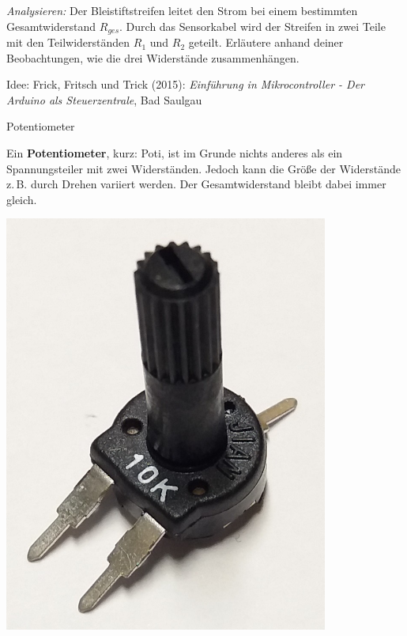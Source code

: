 \begin{aufgabe}
	\medskip
	\emph{Analysieren:}	Der Bleistiftstreifen leitet den Strom bei einem bestimmten Gesamtwiderstand $R_{ges}$. Durch das Sensorkabel wird der Streifen in zwei Teile mit den Teilwiderständen $R_1$ und $R_2$ geteilt. Erläutere anhand deiner Beobachtungen, wie die drei Widerstände zusammenhängen.
	
	{\scriptsize Idee: Frick, Fritsch und Trick (2015): \emph{Einführung in Mikrocontroller - Der Arduino als Steuerzentrale}, Bad Saulgau}
\end{aufgabe}
\vfill

\begin{zsfg}{Potentiometer}
	\begin{minipage}{0.7\textwidth}
		Ein \textbf{Potentiometer}, kurz: Poti, ist im Grunde nichts anderes als ein Spannungsteiler mit zwei Widerständen. Jedoch kann die Größe der Widerstände z.\,B. durch Drehen variiert werden. Der Gesamtwiderstand bleibt dabei immer gleich.
	\end{minipage}
	\hfill
	\begin{minipage}{0.28\textwidth}
		\begin{minipage}{0.48\textwidth}
			\centering
			\includegraphics[angle=-90,width=0.8\textwidth]{./pics/poti.jpg}
		\end{minipage}
		\hfill
		\begin{minipage}{0.48\textwidth}

\end{minipage}
\end{minipage}
\end{zsfg}
